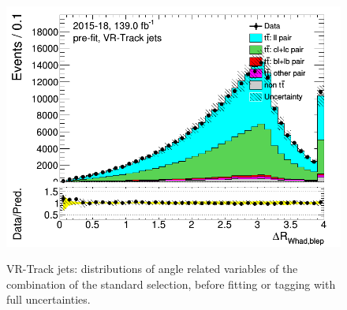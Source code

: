\documentclass[letterpaper,12pt]{article}
\begin{document}
\begin{figure}[H]
\includegraphics[width=.45\textwidth]{FTAG_plots/pretagNoRwwithouthighpTVRJetsall/DataMC_h_dRWhadbleptrackjet.png} \\
\caption{VR-Track jets: distributions of angle related variables of the combination 
of the standard selection, before fitting or tagging with full uncertainties.} \label{fig:standard_angles_VRJets}
\end{figure}
\end{document}
